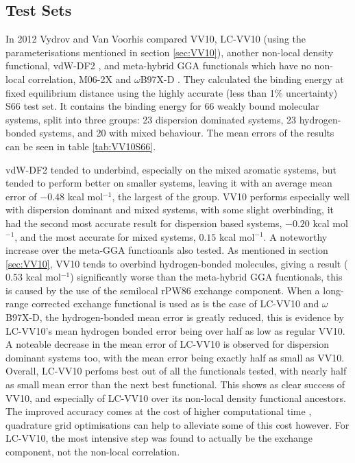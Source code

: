 \documentclass[10pt,a4paper,twocolumn,twoside]{extarticle}
\newcommand{\kcal}{kcal mol\(^{-1}\)}
\begin{document}
	\subsection{Test Sets}
	In 2012 Vydrov and Van Voorhis compared VV10, LC-VV10 (using the parameterisations mentioned in section \ref{sec:VV10}), another non-local density functional, vdW-DF2 \cite{Lee2010-vdW-DF2-Original}, and meta-hybrid GGA functionals which have no non-local correlation, M06-2X \cite{M06-2X} and $\omega$B97X-D \cite{B97X-D}. They calculated the binding energy at fixed equilibrium distance using the highly accurate (less than 1\% uncertainty) S66\cite{s66a, s66b} test set. It contains the binding energy for 66 weakly bound molecular systems, split into three groups: 23 dispersion dominated systems, 23 hydrogen-bonded systems, and 20 with mixed behaviour. The mean errors of the results can be seen in table \ref{tab:VV10S66}.

	vdW-DF2 tended to underbind, especially on the mixed aromatic systems, but tended to perform better on smaller systems, leaving it with an average mean error of $-0.48$ \kcal, the largest of the group. VV10 performs especially well with dispersion dominant and mixed systems, with some slight overbinding, it had the second most accurate result for dispersion based systems, $-0.20$ \kcal, and the most accurate for mixed systems, $0.15$ \kcal. A noteworthy increase over the meta-GGA functioanls also tested. As mentioned in section \ref{sec:VV10}, VV10 tends to overbind hydrogen-bonded molecules, giving a result ($0.53$ \kcal) significantly worse than the meta-hybrid GGA fucntionals, this is caused by the use of the semilocal rPW86 exchange component. When a long-range corrected exchange functional is used as is the case of LC-VV10 and $\omega$B97X-D, the hydrogen-bonded mean error is greatly reduced, this is evidence by LC-VV10's mean hydrogen bonded error being over half as low as regular VV10. 
	A noteable decrease in the mean error of LC-VV10 is observed for dispersion dominant systems too, with the mean error being exactly half as small as VV10. Overall, LC-VV10 perfoms best out of all the functionals tested, with nearly half as small mean error than the next best functional. This shows as clear success of VV10, and especially of LC-VV10 over its non-local density functional ancestors. The improved accuracy comes at the cost of higher computational time \cite{vydrov2008-vdw-comparisons}, quadrature grid optimisations can help to alleviate some of this cost however. For LC-VV10, the most intensive step was found to actually be the exchange component, not the non-local correlation.
\end{document}
